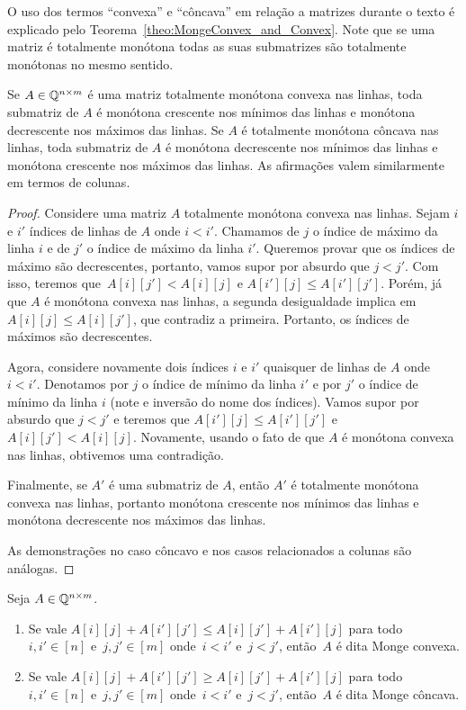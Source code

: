 O uso dos termos ``convexa'' e ``côncava'' em relação a matrizes durante o texto é explicado pelo Teorema~\ref{theo:MongeConvex_and_Convex}. Note que se uma matriz é totalmente monótona todas as suas submatrizes são totalmente monótonas no mesmo sentido.

\begin{lema} \label{lema:MonotoneTotallyMonotone}
Se $A \in \mathbb{Q}^{n \times m}$ é uma matriz totalmente monótona convexa nas linhas, toda submatriz de $A$ é monótona crescente nos mínimos das linhas e monótona decrescente nos máximos das linhas. Se $A$ é totalmente monótona côncava nas linhas, toda submatriz de $A$ é monótona decrescente nos mínimos das linhas e monótona crescente nos máximos das linhas. As afirmações valem similarmente em termos de colunas.
\end{lema}

\begin{proof}
Considere uma matriz $A$ totalmente monótona convexa nas linhas. Sejam $i$ e $i'$ índices de linhas de $A$ onde $i < i'$. Chamamos de $j$ o índice de máximo da linha $i$ e de $j'$ o índice de máximo da linha $i'$. Queremos provar que os índices de máximo são decrescentes, portanto, vamos supor por absurdo que $j < j'$. Com isso, teremos que~${ A[i][j'] < A[i][j] }$ e $A[i'][j] \leq A[i'][j']$. Porém, já que $A$ é monótona convexa nas linhas, a segunda desigualdade implica em $A[i][j] \leq A[i][j']$, que contradiz a primeira. Portanto, os índices de máximos são decrescentes.  

Agora, considere novamente dois índices $i$ e $i'$ quaisquer de linhas de $A$ onde $i < i'$. Denotamos por $j$ o índice de mínimo da linha $i'$ e por $j'$ o índice de mínimo da linha $i$ (note e inversão do nome dos índices). Vamos supor por absurdo que $j < j'$ e teremos que $A[i'][j] \leq A[i'][j']$ e $A[i][j'] < A[i][j]$. Novamente, usando o fato de que $A$ é monótona convexa nas linhas, obtivemos uma contradição.  

Finalmente, se $A'$ é uma submatriz de $A$, então $A'$ é totalmente monótona convexa nas linhas, portanto monótona crescente nos mínimos das linhas e monótona decrescente nos máximos das linhas.

As demonstrações no caso côncavo e nos casos relacionados a colunas são análogas.
\end{proof}

\begin{defi} \label{defi:MatrizMonge}
Seja $A \in \mathbb{Q}^{n \times m}$.
    \begin{enumerate}
        \item Se vale $A[i][j] + A[i'][j'] \leq A[i][j'] + A[i'][j]$ para todo~${i,i' \in [n]}$ e~${j,j' \in [m]}$ onde~${i<i'}$ e~${j<j'}$, então~$A$ é dita Monge convexa.
        \item Se vale $A[i][j] + A[i'][j'] \geq A[i][j'] + A[i'][j]$ para todo~${i,i' \in [n]}$ e~${j,j' \in [m]}$ onde~${i<i'}$ e~${j<j'}$, então~$A$ é dita Monge côncava.
    \end{enumerate}
\end{defi}

